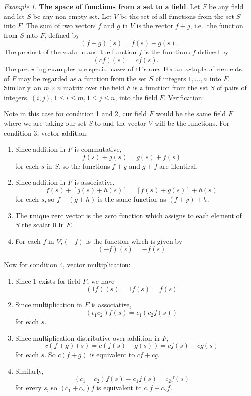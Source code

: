 \documentclass{book}
\theoremstyle{remark}
\newtheorem{example}{Example}[section]
\theoremstyle{definition}
\begin{document}
\begin{example}\label{space_of_functions_from_set_to_field}
\textbf{The space of functions from a set to a field}. Let $F$ be any field and let $S$ be any non-empty set. Let $V$ be the set of all functions from the set $S$ into $F$. The sum of two vectors $f$ and $g$ in $V$ is the vector $f+g$, i.e., the function from $S$ into $F$, defined by
$$\quad(f+g)(s)=f(s)+g(s).$$
The product of the scalar $c$ and the function $f$ is the function $c f$ defined by
$$
(c f)(s)=c f(s) .
$$
The preceding examples are special cases of this one. For an $n$-tuple of elements of $F$ may be regarded as a function from the set $S$ of integers $1, \ldots, n$ into $F$. Similarly, an $m \times n$ matrix over the field $F$ is a function from the set $S$ of pairs of integers, $(i, j), 1 \leq i \leq m, 1 \leq j \leq n$, into the field $F$. Verification:

Note in this case for condition 1 and 2, our field $F$ would be the same field $F$ where we are taking our set $S$ to and the vector $V$ will be the functions. For condition 3, vector addition:
\begin{enumerate}
    \item Since addition in $F$ is commutative,
    $$
    f(s)+g(s)=g(s)+f(s)
    $$
    for each $s$ in $S$, so the functions $f+g$ and $g+f$ are identical.
    \item Since addition in $F$ is associative,
    $$
    f(s)+[g(s)+h(s)]=[f(s)+g(s)]+h(s)
    $$
    for each $s$, so $f+(g+h)$ is the same function as $(f+g)+h$.
    \item The unique zero vector is the zero function which assigns to each element of $S$ the scalar 0 in $F$.
    \item For each $f$ in $V,(-f)$ is the function which is given by
    $$
    (-f)(s)=-f(s)
    $$
\end{enumerate}
Now for condition 4, vector multiplication:
\begin{enumerate}
    \item Since 1 exists for field $F$, we have $$
    (1f)(s) = 1f(s) = f(s)$$
    \item Since multiplication in $F$ is associative, $$(c_1c_2)f(s) = c_1(c_2f(s))$$ for each $s$. 
    \item Since multiplication distributive over addition in $F$, $$c(f + g)(s) = c(f(s) + g(s)) = cf(s) + cg(s)$$ for each $s$. So $c(f + g)$ is equivalent to $cf + cg$. 
    \item Similarly, $$(c_1 + c_2) f(s) = c_1f(s) + c_2f(s)$$ for every $s$, so $(c_1 + c_2)f$ is equivalent to $c_1f + c_2f$. 
\end{enumerate}
\end{example}
\end{document}
